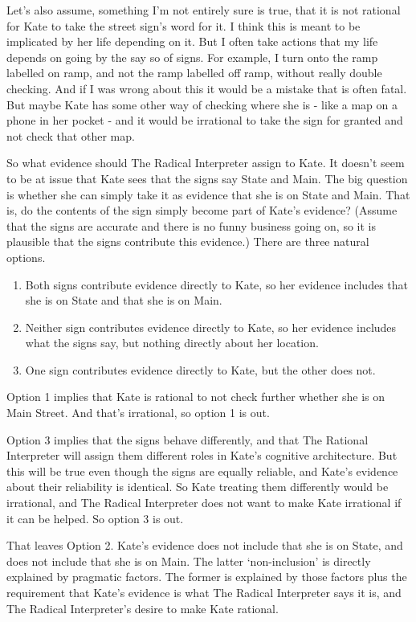 \documentclass[11pt,]{book}
\providecommand{\tightlist}{%
  \setlength{\itemsep}{0pt}\setlength{\parskip}{0pt}}
\begin{document}
Let's also assume, something I'm not entirely sure is true, that it is not rational for Kate to take the street sign's word for it. I think this is meant to be implicated by her life depending on it. But I often take actions that my life depends on going by the say so of signs. For example, I turn onto the ramp labelled on ramp, and not the ramp labelled off ramp, without really double checking. And if I was wrong about this it would be a mistake that is often fatal. But maybe Kate has some other way of checking where she is - like a map on a phone in her pocket - and it would be irrational to take the sign for granted and not check that other map.

So what evidence should The Radical Interpreter assign to Kate. It doesn't seem to be at issue that Kate sees that the signs say State and Main. The big question is whether she can simply take it as evidence that she is on State and Main. That is, do the contents of the sign simply become part of Kate's evidence? (Assume that the signs are accurate and there is no funny business going on, so it is plausible that the signs contribute this evidence.) There are three natural options.

\begin{enumerate}
\def\labelenumi{\arabic{enumi}.}
\tightlist
\item
  Both signs contribute evidence directly to Kate, so her evidence includes that she is on State and that she is on Main.
\item
  Neither sign contributes evidence directly to Kate, so her evidence includes what the signs say, but nothing directly about her location.
\item
  One sign contributes evidence directly to Kate, but the other does not.
\end{enumerate}

Option 1 implies that Kate is rational to not check further whether she is on Main Street. And that's irrational, so option 1 is out.

Option 3 implies that the signs behave differently, and that The Rational Interpreter will assign them different roles in Kate's cognitive architecture. But this will be true even though the signs are equally reliable, and Kate's evidence about their reliability is identical. So Kate treating them differently would be irrational, and The Radical Interpreter does not want to make Kate irrational if it can be helped. So option 3 is out.

That leaves Option 2. Kate's evidence does not include that she is on State, and does not include that she is on Main. The latter `non-inclusion' is directly explained by pragmatic factors. The former is explained by those factors plus the requirement that Kate's evidence is what The Radical Interpreter says it is, and The Radical Interpreter's desire to make Kate rational.
\end{document}

